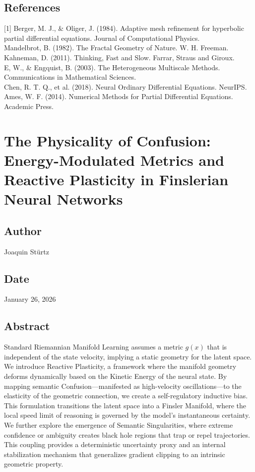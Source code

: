 \documentclass{article}
\numberwithin{equation}{section}
\begin{document}
\subsection*{References}
[1] Berger, M. J., \& Oliger, J. (1984). Adaptive mesh refinement for hyperbolic partial differential equations. Journal of Computational Physics.\\
[2] Mandelbrot, B. (1982). The Fractal Geometry of Nature. W. H. Freeman.\\
[3] Kahneman, D. (2011). Thinking, Fast and Slow. Farrar, Straus and Giroux.\\
[4] E, W., \& Engquist, B. (2003). The Heterogeneous Multiscale Methods. Communications in Mathematical Sciences.\\
[5] Chen, R. T. Q., et al. (2018). Neural Ordinary Differential Equations. NeurIPS.\\
[6] Ames, W. F. (2014). Numerical Methods for Partial Differential Equations. Academic Press.

\section{The Physicality of Confusion: Energy-Modulated Metrics and Reactive Plasticity in Finslerian Neural Networks}
\subsection*{Author}
Joaquin Stürtz
\subsection*{Date}
January 26, 2026
\subsection*{Abstract}
Standard Riemannian Manifold Learning assumes a metric $g(x)$ that is independent of the state velocity, implying a static geometry for the latent space. We introduce Reactive Plasticity, a framework where the manifold geometry deforms dynamically based on the Kinetic Energy of the neural state. By mapping semantic Confusion---manifested as high-velocity oscillations---to the elasticity of the geometric connection, we create a self-regulatory inductive bias. This formulation transitions the latent space into a Finsler Manifold, where the local speed limit of reasoning is governed by the model's instantaneous certainty. We further explore the emergence of Semantic Singularities, where extreme confidence or ambiguity creates black hole regions that trap or repel trajectories. This coupling provides a deterministic uncertainty proxy and an internal stabilization mechanism that generalizes gradient clipping to an intrinsic geometric property.
\end{document}
